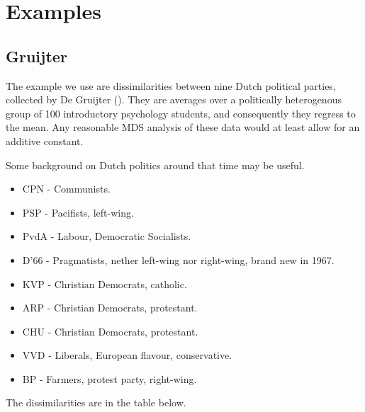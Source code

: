 \documentclass[
  12pt,
  letterpaper,
  DIV=11,
  numbers=noendperiod]{scrartcl}
\providecommand{\tightlist}{%
  \setlength{\itemsep}{0pt}\setlength{\parskip}{0pt}}\usepackage{longtable,booktabs,array}
\newcommand{\sectionbreak}{\pagebreak}
\theoremstyle{plain}
\theoremstyle{plain}
\theoremstyle{plain}
\theoremstyle{definition}
\theoremstyle{remark}
\begin{document}
\sectionbreak

\section{Examples}\label{examples}

\subsection{Gruijter}\label{gruijter}

The example we use are dissimilarities between nine Dutch political
parties, collected by De Gruijter ().
They are averages over a politically heterogenous group of 100
introductory psychology students, and consequently they regress to the
mean. Any reasonable MDS analysis of these data would at least allow for
an additive constant.

Some background on Dutch politics around that time may be useful.

\begin{itemize}
\tightlist
\item
  CPN - Communists.
\item
  PSP - Pacifists, left-wing.
\item
  PvdA - Labour, Democratic Socialists.
\item
  D'66 - Pragmatists, nether left-wing nor right-wing, brand new in
  1967.
\item
  KVP - Christian Democrats, catholic.
\item
  ARP - Christian Democrats, protestant.
\item
  CHU - Christian Democrats, protestant.
\item
  VVD - Liberals, European flavour, conservative.
\item
  BP - Farmers, protest party, right-wing.
\end{itemize}

The dissimilarities are in the table below.
\end{document}
